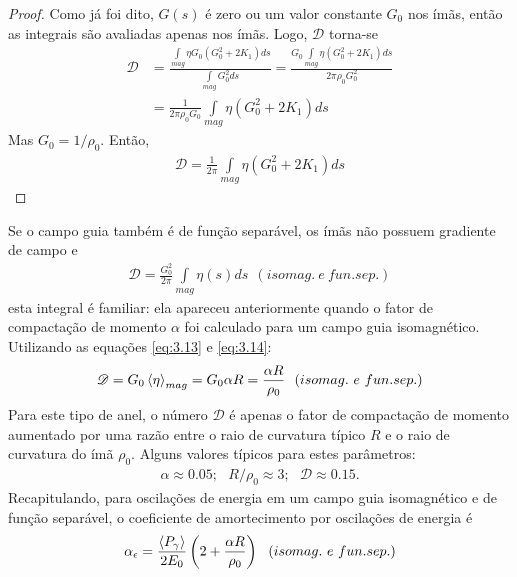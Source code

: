 \begin{proof}
	Como já foi dito, $G(s)$ é zero ou um valor constante $G_0$ nos ímãs, então as integrais são avaliadas apenas nos ímãs. Logo, $\mathscr{D}$ torna-se
	\begin{align*}
		\mathscr{D} &= \frac{\int\limits_{mag}^{} \eta G_0 \left(G_0^2 + 2K_1\right)ds}{\int\limits_{mag}^{} G_0^2 ds} = \frac{G_0\int\limits_{mag}^{} \eta \left(G_0^2 + 2K_1\right)ds}{2\pi \rho_0 G_0^2}\\
		 &= \frac{1}{2\pi \rho_0 G_0}\int\limits_{mag}^{} \eta \left(G_0^2 + 2K_1\right)ds
	\end{align*}
	Mas $G_0 = 1/\rho_0$. Então,
	\begin{align*}
		\mathscr{D} = \frac{1}{2\pi}\int\limits_{mag}^{} \eta \left(G_0^2 + 2K_1\right)ds
	\end{align*}
\end{proof}

Se o campo guia também é de função separável, os ímãs não possuem gradiente de campo e
\begin{align}
	\mathscr{D} = \frac{G_0^2}{2\pi}\int\limits_{mag}^{}\eta(s)ds\ \ (isomag.\ e\ fun. sep.)
\end{align}
esta integral é familiar: ela apareceu anteriormente quando o fator de compactação de momento $\alpha$ foi calculado para um campo guia isomagnético. Utilizando as equações \eqref{eq:3.13} e \eqref{eq:3.14}:
\begin{align}
	\mathscr{D} = G_0\left< \eta \right>_{mag} = G_0\alpha R = \frac{\alpha R}{\rho_0}\ \ (isomag.\ e\ fun. sep.)\label{eq:4.22}
\end{align}
Para este tipo de anel, o número $\mathscr{D}$ é apenas o fator de compactação de momento aumentado por uma razão entre o raio de curvatura típico $R$ e o raio de curvatura do ímã $\rho_0$. Alguns valores típicos para estes parâmetros:
\begin{align}
	\alpha \approx 0.05;\ \ \ R/\rho_0 \approx 3;\ \ \ \mathscr{D} \approx 0.15.
\end{align}
Recapitulando, para oscilações de energia em um campo guia isomagnético e de função separável, o coeficiente de amortecimento por oscilações de energia é
\begin{align}
	\alpha_\epsilon = \frac{\left< P_\gamma \right>}{2E_0}\left(2+ \frac{\alpha R}{\rho_0}\right)\ \ (isomag.\ e\ fun. sep.)
\end{align}